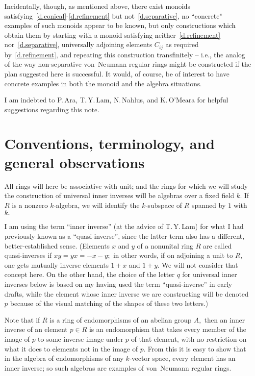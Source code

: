 \documentclass{amsart}
\begin{document}
Incidentally, though, as mentioned above, there exist monoids
satisfying~\eqref{d.conical}-\eqref{d.refinement}
but not~\eqref{d.separative},
no ``concrete'' examples of such monoids appear
to be known, but only constructions which obtain them by
starting with a monoid satisfying neither~\eqref{d.refinement}
nor~\eqref{d.separative}, universally
adjoining elements $C_{ij}$ as required by~\eqref{d.refinement},
and repeating this construction transfinitely -- i.e.,
the analog of the way non-separative von~Neumann regular rings might be
constructed if the plan suggested here is successful.
It would, of course, be of interest to have
concrete examples in both the monoid and the algebra situations.

I am indebted to P.\,Ara, T.\,Y.\,Lam, N.\,Nahlus, and
K.\,O'Meara for helpful suggestions regarding this note.

\section{Conventions, terminology, and general observations}\label{S.defs}
All rings will here be associative with unit; and
the rings for which we will study the construction of
universal inner inverses will be algebras over a fixed field $k.$
If $R$ is a nonzero $\!k\!$-algebra, we will identify
the $\!k\!$-subspace of $R$ spanned by $1$ with $k.$

I am using the term ``inner inverse'' (at the advice of
T.\,Y.\,Lam) for what I had previously known as a ``quasi-inverse'',
since the latter term also has a different, better-established sense.
(Elements $x$ and $y$ of a nonunital ring $R$ are called quasi-inverses
if $xy=yx=-x-y;$ in other words, if on adjoining a unit to $R,$ one
gets mutually inverse elements $1+x$ and $1+y.$
We will not consider that concept here.
On the other hand, the choice of the letter $q$ for universal inner
inverses below is based on my having used the
term ``quasi-inverse'' in early
drafts, while the element whose inner inverse we
are constructing will be denoted $p$ because of the visual matching
of the shapes of these two letters.)

Note that if $R$ is a ring of endomorphisms of an abelian group $A,$
then an inner inverse of an element $p\in R$ is an endomorphism that
takes every member of the image of $p$ to some inverse image under $p$
of that element, with no restriction on what it does to elements
not in the image of $p.$
From this it is easy to show that in the algebra of endomorphisms of any
$\!k\!$-vector space, every element has an inner inverse; so such
algebras are examples of von~Neumann regular rings.
\end{document}
